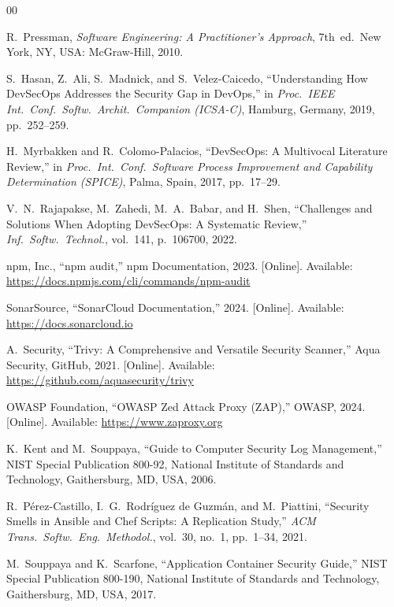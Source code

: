 \documentclass[10pt,conference]{IEEEtran}
\begin{document}
\begin{thebibliography}{00}

R.~Pressman, \emph{Software Engineering: A Practitioner's Approach},
7th~ed.\ New York, NY, USA: McGraw-Hill, 2010.

S.~Hasan, Z.~Ali, S.~Madnick, and S.~Velez-Caicedo,
``Understanding How DevSecOps Addresses the Security Gap in DevOps,''
in \emph{Proc.\ IEEE Int.\ Conf.\ Softw.\ Archit.\ Companion (ICSA-C)},
Hamburg, Germany, 2019, pp.\ 252--259.

H.~Myrbakken and R.~Colomo-Palacios,
``DevSecOps: A Multivocal Literature Review,''
in \emph{Proc.\ Int.\ Conf.\ Software Process Improvement and Capability
Determination (SPICE)}, Palma, Spain, 2017, pp.\ 17--29.

V.~N.~Rajapakse, M.~Zahedi, M.~A.~Babar, and H.~Shen,
``Challenges and Solutions When Adopting DevSecOps: A Systematic Review,''
\emph{Inf.\ Softw.\ Technol.}, vol.~141, p.\ 106700, 2022.

npm, Inc., ``npm audit,'' npm Documentation, 2023. [Online].
Available: \url{https://docs.npmjs.com/cli/commands/npm-audit}

SonarSource, ``SonarCloud Documentation,'' 2024. [Online].
Available: \url{https://docs.sonarcloud.io}

A.~Security, ``Trivy: A Comprehensive and Versatile Security Scanner,''
Aqua Security, GitHub, 2021. [Online].
Available: \url{https://github.com/aquasecurity/trivy}

OWASP Foundation, ``OWASP Zed Attack Proxy (ZAP),'' OWASP, 2024. [Online].
Available: \url{https://www.zaproxy.org}

K.~Kent and M.~Souppaya, ``Guide to Computer Security Log Management,''
NIST Special Publication 800-92, National Institute of Standards and Technology,
Gaithersburg, MD, USA, 2006.

R.~Pérez-Castillo, I.~G.~Rodríguez de Guzmán, and M.~Piattini,
``Security Smells in Ansible and Chef Scripts: A Replication Study,''
\emph{ACM Trans.\ Softw.\ Eng.\ Methodol.}, vol.\ 30, no.\ 1, pp.\ 1--34,
2021.

M.~Souppaya and K.~Scarfone, ``Application Container Security Guide,''
NIST Special Publication 800-190, National Institute of Standards and Technology,
Gaithersburg, MD, USA, 2017.

\end{thebibliography}
\end{document}
